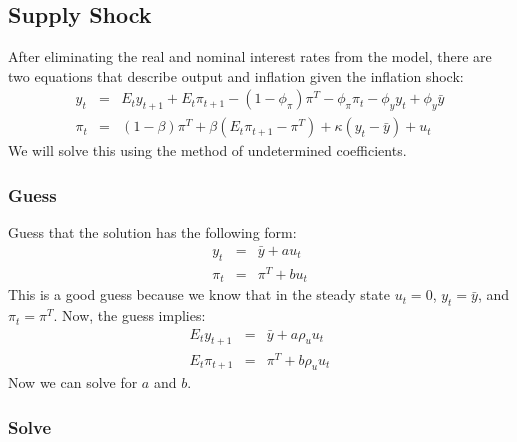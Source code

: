 \documentclass[12pt,fleqn]{article}
\newcommand{\EE}{\begin{eqnarray}}
\newcommand{\FF}{\end{eqnarray}}
\begin{document}
\begin{appendix}
\subsection{Supply Shock}
\label{sec:solution_supply}

After eliminating the real and nominal interest rates from the model, there are two equations that describe output and inflation given the inflation shock:
	\EE
	y_t & = & E_t y_{t+1} + E_t\pi_{t+1}  - (1-\phi_{\pi})\pi^T - \phi_{\pi}\pi_t - \phi_y y_t + \phi_y \bar{y} \\
	\pi_t & = & (1-\beta) \pi^T + \beta \left( E_t\pi_{t+1} - \pi^T\right)  + \kappa (y_t -\bar{y}) + u_t
	\FF
We will solve this using the method of undetermined coefficients.

\subsubsection{Guess}

Guess that the solution has the following form:
	\EE
	y_t & = & \bar{y} + a u_t\\
	\pi_t & = & \pi^T + b u_t
	\FF
This is a good guess because we know that in the steady state $u_t = 0$, $y_t = \bar{y}$, and $\pi_t = \pi^T$. Now, the guess implies:
	\EE
	E_ty_{t+1} & = & \bar{y} + a \rho_uu_t\\
	E_t\pi_{t+1} & = & \pi^T + b \rho_uu_t
	\FF
Now we can solve for $a$ and $b$.	


\subsubsection{Solve}


\end{appendix}
\end{document}
